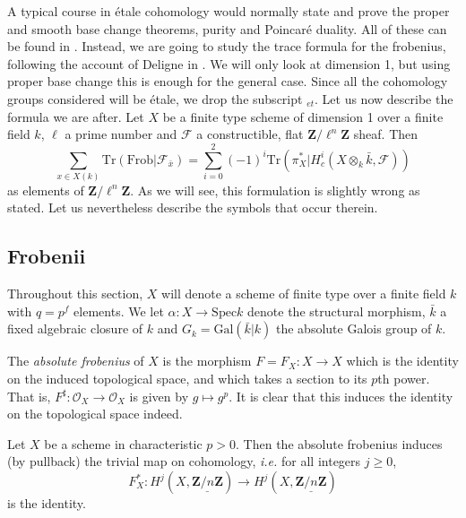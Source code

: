A typical course in \'etale cohomology would normally state and prove the proper and smooth base change theorems, purity and Poincar\'e duality. All of these can be found in \cite[Arcata]{SGA4.5}. Instead, we are going to study the trace formula for the frobenius, following the account of Deligne in \cite[Rapport]{SGA4.5}. We will only look at dimension 1, but using proper base change this is enough for the general case. Since all the cohomology groups considered will be \'etale, we drop the subscript $_{et}$. Let us now describe the formula we are after. Let $X$ be a finite type scheme of dimension 1 over a finite field $k$, $\ell$ a prime number and $\mathcal{F}$ a constructible, flat $\mathbf{Z}/\ell^n\mathbf{Z}$ sheaf. Then
\begin{equation*} \tag{$*$} \label{eq:TraceFormula}
\sum_{x \in X(k)} \text{Tr}(\text{Frob} | \mathcal{F}_{\bar x}) = \sum_{i=0}^2 (-1)^i \text{Tr}(\pi_X^* | H^i_c(X\otimes_k \bar k, \mathcal{F}))
\end{equation*}
as elements of $\mathbf{Z}/\ell^n\mathbf{Z}$. As we will see, this formulation is slightly wrong as stated. Let us nevertheless describe the symbols that occur therein.

\subsection{Frobenii}
\label{subsection:Frobenii}

Throughout this section, $X$ will denote a scheme of finite type over a finite field $k$ with $q = p^f$ elements. We let $\alpha : X \to \text{Spec} k$ denote the structural morphism, $\bar k$ a fixed algebraic closure of $k$ and $G_k = \text{Gal}(\bar k | k)$ the absolute Galois group of $k$.

\begin{definition}
The \emph{absolute frobenius} of $X$ is the morphism $F = F_X : X \to X$ which is the identity on the induced topological space, and which takes a section to its $p$th power. That is, $F^\sharp : \mathcal{O}_X \to \mathcal{O}_X$ is given by $g \mapsto g^p$. It is clear that this induces the identity on the topological space indeed.
\end{definition}

\begin{theorem} \label{thm:TheBafflingTheorem}
Let $X$ be a scheme in characteristic $p>0$. Then the absolute frobenius induces (by pullback) the trivial map on cohomology, {\it i.e.} for all integers $j\geq 0$,
$$
F_X^* : H^j (X, \underline{\mathbf{Z}/n\mathbf{Z}}) \longrightarrow  H^j (X, \underline{\mathbf{Z}/n\mathbf{Z}})
$$
is the identity.
\end{theorem}


